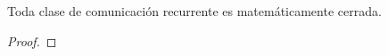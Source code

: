 \begin{teo}
    Toda clase de comunicación recurrente es matemáticamente cerrada.

\begin{proof}



\end{proof}
\end{teo}


